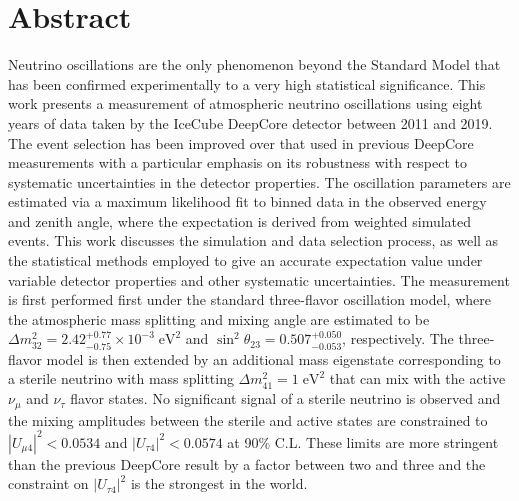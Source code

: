 \chapter{Abstract}

Neutrino oscillations are the only phenomenon beyond the Standard Model that has been confirmed experimentally to a very high statistical significance.
This work presents a measurement of atmospheric neutrino oscillations using eight years of data taken by the IceCube DeepCore detector between 2011 and 2019.
The event selection has been improved over that used in previous DeepCore measurements with a particular emphasis on its robustness with respect to systematic uncertainties in the detector properties.
The oscillation parameters are estimated via a maximum likelihood fit to binned data in the observed energy and zenith angle, where the expectation is derived from weighted simulated events.
This work discusses the simulation and data selection process, as well as the statistical methods employed to give an accurate expectation value under variable  detector properties and other systematic uncertainties.
The measurement is first performed first under the standard three-flavor oscillation model, where the atmospheric mass splitting and mixing angle are estimated to be $\Delta m^2_{32} = 2.42_{-0.75}^{+0.77} \times10^{-3}\;\mathrm{eV}^2$ and $\sin^2\theta_{23} = 0.507_{-0.053}^{+0.050}$, respectively.
The three-flavor model is then extended by an additional mass eigenstate corresponding to a sterile neutrino with mass splitting $\Delta m^2_{41} = 1\;\mathrm{eV}^2$ that can mix with the active $\nu_\mu$ and $\nu_\tau$ flavor states.
No significant signal of a sterile neutrino is observed and the mixing amplitudes between the sterile and active states are constrained to $|U_{\mu 4}|^2 < 0.0534$ and $|U_{\tau 4}|^2 < 0.0574$ at 90\% C.L.
These limits are more stringent than the previous DeepCore result by a factor between two and three and the constraint on $|U_{\tau 4}|^2$ is the strongest in the world.
